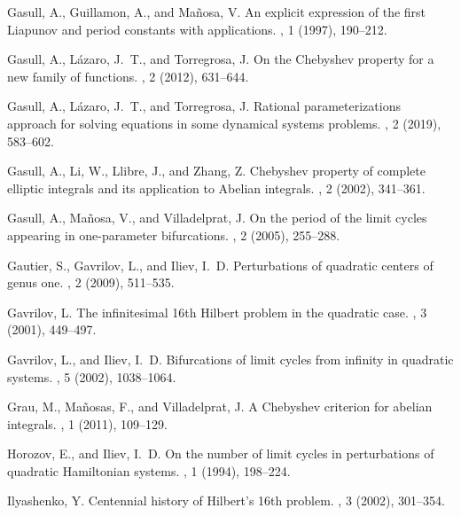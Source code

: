\documentclass[12pt,a4paper,reqno]{amsart}
\begin{document}
\begin{thebibliography}{10}
{\sc Gasull, A., Guillamon, A., and Ma\~{n}osa, V.}
\newblock An explicit expression of the first {L}iapunov and period constants
  with applications.
, 1 (1997), 190--212.

{\sc Gasull, A., L\'{a}zaro, J.~T., and Torregrosa, J.}
\newblock On the {C}hebyshev property for a new family of functions.
, 2 (2012), 631--644.

{\sc Gasull, A., L\'{a}zaro, J.~T., and Torregrosa, J.}
\newblock Rational parameterizations approach for solving equations in some
  dynamical systems problems.
, 2 (2019), 583--602.

{\sc Gasull, A., Li, W., Llibre, J., and Zhang, Z.}
\newblock Chebyshev property of complete elliptic integrals and its application
  to {A}belian integrals.
, 2 (2002), 341--361.

{\sc Gasull, A., Ma\~{n}osa, V., and Villadelprat, J.}
\newblock On the period of the limit cycles appearing in one-parameter
  bifurcations.
, 2 (2005), 255--288.

{\sc Gautier, S., Gavrilov, L., and Iliev, I.~D.}
\newblock Perturbations of quadratic centers of genus one.
, 2 (2009), 511--535.

{\sc Gavrilov, L.}
\newblock The infinitesimal 16th {H}ilbert problem in the quadratic case.
, 3 (2001), 449--497.

{\sc Gavrilov, L., and Iliev, I.~D.}
\newblock Bifurcations of limit cycles from infinity in quadratic systems.
, 5 (2002), 1038--1064.

{\sc Grau, M., Ma\~{n}osas, F., and Villadelprat, J.}
\newblock A {C}hebyshev criterion for abelian integrals.
, 1 (2011), 109--129.

{\sc Horozov, E., and Iliev, I.~D.}
\newblock On the number of limit cycles in perturbations of quadratic
  {H}amiltonian systems.
, 1 (1994), 198--224.

{\sc Ilyashenko, Y.}
\newblock Centennial history of {H}ilbert's 16th problem.
, 3 (2002), 301--354.


\end{thebibliography}
\end{document}
